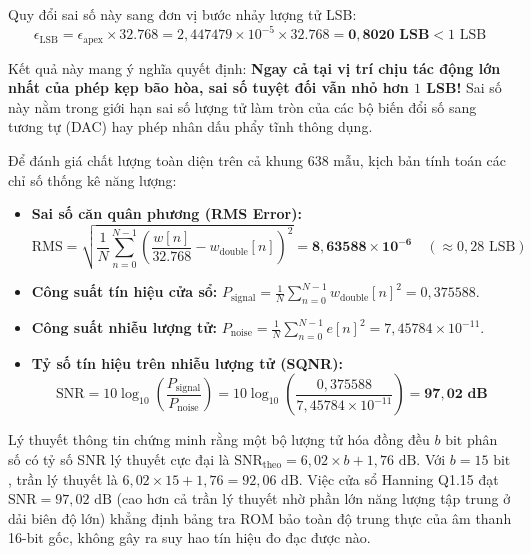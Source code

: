 Quy đổi sai số này sang đơn vị bước nhảy lượng tử LSB:
\begin{equation}
\epsilon_{\text{LSB}} = \epsilon_{\text{apex}} \times 32.768 = 2{,}447479 \times 10^{-5} \times 32.768 = \mathbf{0{,}8020\text{ LSB}} < 1\text{ LSB}
\end{equation}

Kết quả này mang ý nghĩa quyết định: \textbf{Ngay cả tại vị trí chịu tác động lớn nhất của phép kẹp bão hòa, sai số tuyệt đối vẫn nhỏ hơn $1$ LSB!} Sai số này nằm trong giới hạn sai số lượng tử làm tròn của các bộ biến đổi số sang tương tự (DAC) hay phép nhân dấu phẩy tĩnh thông dụng.

Để đánh giá chất lượng toàn diện trên cả khung $638\text{ mẫu}$, kịch bản  tính toán các chỉ số thống kê năng lượng:
\begin{itemize}[leftmargin=1.5em, itemsep=2pt]
    \item \textbf{Sai số căn quân phương (RMS Error):}
    \begin{equation}
    \text{RMS} = \sqrt{\frac{1}{N} \sum_{n=0}^{N-1} \left( \frac{w[n]}{32.768} - w_{\text{double}}[n] \right)^2} = \mathbf{8{,}63588 \times 10^{-6}} \quad (\approx 0{,}28\text{ LSB})
    \end{equation}
    \item \textbf{Công suất tín hiệu cửa sổ:} $P_{\text{signal}} = \frac{1}{N} \sum_{n=0}^{N-1} w_{\text{double}}[n]^2 = 0{,}375588$.
    \item \textbf{Công suất nhiễu lượng tử:} $P_{\text{noise}} = \frac{1}{N} \sum_{n=0}^{N-1} e[n]^2 = 7{,}45784 \times 10^{-11}$.
    \item \textbf{Tỷ số tín hiệu trên nhiễu lượng tử (SQNR):}
    \begin{equation}
    \text{SNR} = 10 \log_{10}\left( \frac{P_{\text{signal}}}{P_{\text{noise}}} \right) = 10 \log_{10}\left( \frac{0{,}375588}{7{,}45784 \times 10^{-11}} \right) = \mathbf{97{,}02\text{ dB}}
    \end{equation}
\end{itemize}

Lý thuyết thông tin chứng minh rằng một bộ lượng tử hóa đồng đều $b\text{ bit}$ phân số có tỷ số SNR lý thuyết cực đại là $\text{SNR}_{\text{theo}} = 6{,}02 \times b + 1{,}76\text{ dB}$. Với $b = 15\text{ bit}$, trần lý thuyết là $6{,}02 \times 15 + 1{,}76 = 92{,}06\text{ dB}$. Việc cửa sổ Hanning Q1.15 đạt $\text{SNR} = 97{,}02\text{ dB}$ (cao hơn cả trần lý thuyết nhờ phần lớn năng lượng tập trung ở dải biên độ lớn) khẳng định bảng tra ROM bảo toàn độ trung thực của âm thanh 16-bit gốc, không gây ra suy hao tín hiệu đo đạc được nào.

